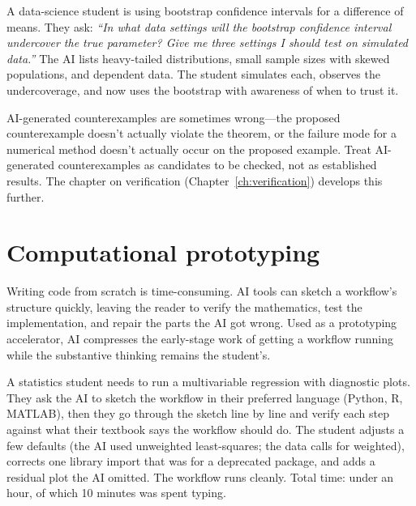 \documentclass[11pt]{book}
\begin{document}
\begin{example}
A data-science student is using bootstrap confidence intervals for a difference of means. They ask: \emph{``In what data settings will the bootstrap confidence interval undercover the true parameter? Give me three settings I should test on simulated data.''} The AI lists heavy-tailed distributions, small sample sizes with skewed populations, and dependent data. The student simulates each, observes the undercoverage, and now uses the bootstrap with awareness of when to trust it.
\end{example}

\begin{watchout}
AI-generated counterexamples are sometimes wrong---the proposed counterexample doesn't actually violate the theorem, or the failure mode for a numerical method doesn't actually occur on the proposed example. Treat AI-generated counterexamples as candidates to be checked, not as established results. The chapter on verification (Chapter~\ref{ch:verification}) develops this further.
\end{watchout}

\section{Computational prototyping}

Writing code from scratch is time-consuming. AI tools can sketch a workflow's structure quickly, leaving the reader to verify the mathematics, test the implementation, and repair the parts the AI got wrong. Used as a prototyping accelerator, AI compresses the early-stage work of getting a workflow running while the substantive thinking remains the student's.

\begin{example}
A statistics student needs to run a multivariable regression with diagnostic plots. They ask the AI to sketch the workflow in their preferred language (Python, R, MATLAB), then they go through the sketch line by line and verify each step against what their textbook says the workflow should do. The student adjusts a few defaults (the AI used unweighted least-squares; the data calls for weighted), corrects one library import that was for a deprecated package, and adds a residual plot the AI omitted. The workflow runs cleanly. Total time: under an hour, of which 10 minutes was spent typing.
\end{example}
\end{document}
